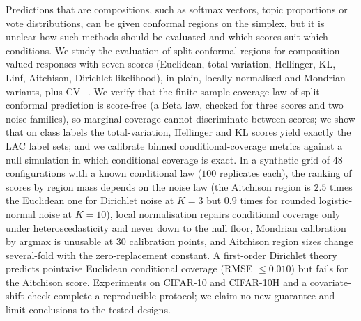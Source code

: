 Predictions that are compositions, such as softmax vectors, topic proportions or vote distributions, can be given conformal regions on the simplex, but it is unclear how such methods should be evaluated and which scores suit which conditions. We study the evaluation of split conformal regions for composition-valued responses with seven scores (Euclidean, total variation, Hellinger, KL, Linf, Aitchison, Dirichlet likelihood), in plain, locally normalised and Mondrian variants, plus CV+. We verify that the finite-sample coverage law of split conformal prediction is score-free (a Beta law, checked for three scores and two noise families), so marginal coverage cannot discriminate between scores; we show that on class labels the total-variation, Hellinger and KL scores yield exactly the LAC label sets; and we calibrate binned conditional-coverage metrics against a null simulation in which conditional coverage is exact. In a synthetic grid of $48$ configurations with a known conditional law ($100$ replicates each), the ranking of scores by region mass depends on the noise law (the Aitchison region is $2.5$ times the Euclidean one for Dirichlet noise at $K=3$ but $0.9$ times for rounded logistic-normal noise at $K=10$), local normalisation repairs conditional coverage only under heteroscedasticity and never down to the null floor, Mondrian calibration by argmax is unusable at $30$ calibration points, and Aitchison region sizes change several-fold with the zero-replacement constant. A first-order Dirichlet theory predicts pointwise Euclidean conditional coverage (RMSE $\le0.010$) but fails for the Aitchison score. Experiments on CIFAR-10 and CIFAR-10H and a covariate-shift check complete a reproducible protocol; we claim no new guarantee and limit conclusions to the tested designs.
